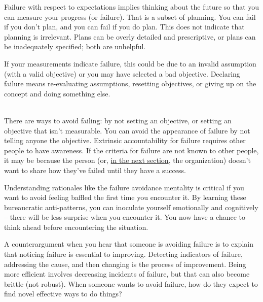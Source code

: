 Failure with respect to expectations implies thinking about the future so that you can measure your progress (or failure). That is a subset of planning. You can fail if you don't plan, and you can fail if you do plan. This does not indicate that planning is irrelevant. Plans can be overly detailed and prescriptive, or plans can be inadequately specified; both are unhelpful.
%
%

If your measurements indicate failure, this could be due to an invalid assumption (with a valid objective) or you may have selected a bad objective. Declaring failure means re-evaluating assumptions, resetting objectives, or giving up on the concept and doing something else.

\ \\

There are ways to avoid failing: by not setting an objective, or setting an objective that isn't measurable. You can avoid the appearance of failure by not telling anyone the objective. Extrinsic accountability for failure requires other people to have awareness. If the criteria for failure are not known to other people, it may be because the person (or, \hyperref[sec:org-failure-and-success]{in the next section},
the organization) doesn't want to share how they've failed until they have a success. 

Understanding rationales like the failure avoidance mentality is critical if you want to avoid feeling baffled the first time you encounter it. By learning these bureaucratic anti-patterns, you can inoculate yourself emotionally and cognitively -- there will be less surprise when you encounter it. You now have a chance to think ahead before encountering the situation.

A counterargument when you hear that someone is avoiding failure is to explain that noticing failure is essential to improving. Detecting indicators of failure, addressing the cause, and then changing is the process of improvement. Being more efficient involves decreasing incidents of failure, but that can also become brittle (not robust). When someone wants to avoid failure, how do they expect to find novel effective ways to do things? 

